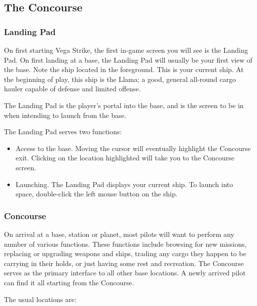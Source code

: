 \documentclass{article}
\begin{document}
\subsection{ The Concourse }

\subsubsection{ Landing Pad }

On first starting Vega Strike, the first in-game screen you will see is the Landing Pad. On first landing at a base, the Landing Pad will usually be your first view of the base. Note the ship located in the foreground. This is your current ship. At the beginning of play, this ship is the Llama; a good, general all-round cargo hauler capable of defense and limited offense. 

The Landing Pad is the player's portal into the base, and is the screen to be in when intending to launch from the base. 

The Landing Pad serves two functions: 

\begin{itemize}
\item  Access to the base. Moving the cursor will eventually highlight the Concourse exit. Clicking on the location highlighted will take you to the Concourse screen. 

\item  Launching. The Landing Pad displays your current ship. To launch into space, double-click the left mouse button on the ship. 
\end{itemize}



\subsubsection{ Concourse }

On arrival at a base, station or planet, most pilots will want to perform any number of various functions. These functions include browsing for new missions, replacing or upgrading weapons and ships, trading any cargo they happen to be carrying in their holds, or just having some rest and recreation. The Concourse serves as the primary interface to all other base locations. A newly arrived pilot can find it all starting from the Concourse. 

The usual locations are: 
\end{document}
